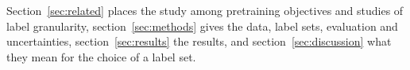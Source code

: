 Section~\ref{sec:related} places the study among pretraining objectives and studies of label granularity,
section~\ref{sec:methods} gives the data, label sets, evaluation and uncertainties, section~\ref{sec:results} the
results, and section~\ref{sec:discussion} what they mean for the choice of a label set.
